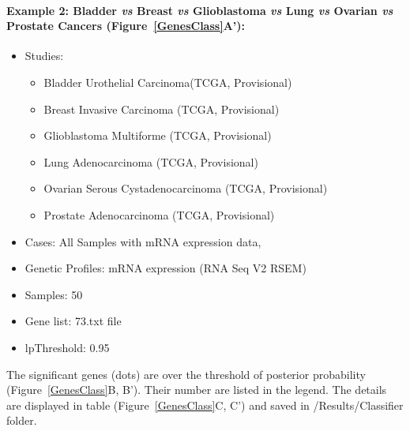 \documentclass[a4paper]{article}
\begin{document}
\paragraph{Example 2: Bladder \emph{vs} Breast \emph{vs} Glioblastoma \emph{vs} Lung \emph{vs} Ovarian \emph{vs} Prostate Cancers (Figure~\ref{GenesClass}A'):}

\begin{itemize}
    \item Studies:
     \begin{itemize}
     \item Bladder Urothelial Carcinoma(TCGA, Provisional)
     \item Breast Invasive Carcinoma (TCGA, Provisional)
     \item Glioblastoma Multiforme (TCGA, Provisional)
     \item Lung Adenocarcinoma (TCGA, Provisional)
     \item Ovarian Serous Cystadenocarcinoma (TCGA, Provisional)
     \item Prostate Adenocarcinoma (TCGA, Provisional)
     \end{itemize}
     
    \item Cases: All Samples with mRNA expression data,
    \item Genetic Profiles: mRNA expression (RNA Seq V2 RSEM)
    \item Samples: 50
    \item Gene list: 73.txt file
    \item lpThreshold: 0.95
 \end{itemize}



The significant genes (dots)  are over the threshold of posterior probability (Figure~\ref{GenesClass}B, B'). Their number are listed in the legend. The details are displayed in table (Figure~\ref{GenesClass}C, C') and saved in /Results/Classifier folder.
\end{document}

